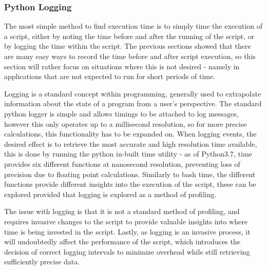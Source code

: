 \subsubsection{Python Logging}
The most simple method to find execution time is to simply time the execution of a script, either by noting the time
before and after the running of the script, or by logging the time within the script.
The previous sections showed that there are many easy ways to record the time before and after script
execution, so this section will rather focus on situations where this is not desired - namely in applications that are
not expected to run for short periods of time.

Logging is a standard concept within programming, generally used to extrapolate
information about the state of a program from a user's perspective.
The standard python logger\cite{PythonLogging} is simple and allows timings to be attached to log messages, however
this only operates up to a millisecond resolution, so for more precise calculations, this functionality has to be
expanded on.
When logging events, the desired effect is to retrieve the most accurate and high resolution time available, this is
done by running the python in-built time\cite{PythonTime} utility - as of Python3.7, time provides six different
functions at nanosecond resolution\cite{PythonTimePEP}, preventing loss of precision due to floating point calculations.
Similarly to bash time, the different functions provide different insights into the execution of the script, these
can be explored provided that logging is explored as a method of profiling.

The issue with logging is that it is not a standard method of profiling, and requires invasive changes to the script to
provide valuable insights into where time is being invested in the script.
Lastly, as logging is an invasive process, it will undoubtedly affect the performance of the script, which introduces
the decision of correct logging intervals to minimize overhead while still retrieving sufficiently precise data.


